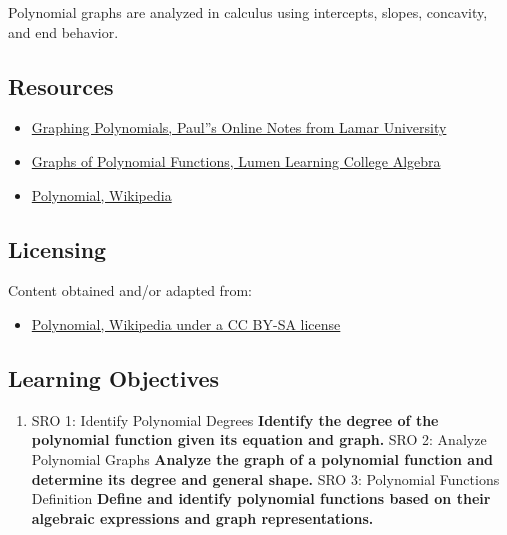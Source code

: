 Polynomial graphs are analyzed in calculus using intercepts, slopes, concavity, and end
behavior.

\subsection{Resources}
\label{sss:reso-55b5}

\begin{itemize}
    \item \href{https://tutorial.math.lamar.edu/classes/alg/graphingpolynomials.aspx}{Graphing Polynomials, Paul''s Online Notes from Lamar University}
    \item \href{https://courses.lumenlearning.com/collegealgebra2017/chapter/graphs-of-polynomial-functions/}{Graphs of Polynomial Functions, Lumen Learning College Algebra}
    \item \href{https://en.wikipedia.org/wiki/Polynomial}{Polynomial, Wikipedia}
\end{itemize}

\subsection{Licensing}
\label{sss:lice-7352}

Content obtained and/or adapted from:

\begin{itemize}
    \item \href{https://en.wikipedia.org/wiki/Polynomial}{Polynomial, Wikipedia under a CC BY-SA license}
\end{itemize}

\subsection{Learning Objectives}
\label{ssec:lear-8fbd}

\begin{enumerate}
    \item SRO 1: Identify Polynomial Degrees \textbf{Identify the degree of the polynomial function given its equation and graph.} SRO 2: Analyze Polynomial Graphs \textbf{Analyze the graph of a polynomial function and determine its degree and general shape.} SRO 3: Polynomial Functions Definition \textbf{Define and identify polynomial functions based on their algebraic expressions and graph representations.}
\end{enumerate}


